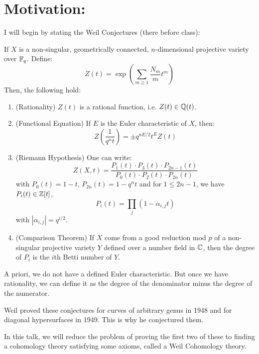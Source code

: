 \documentclass[12pt]{amsart}
\begin{document}


\section{Motivation:}

I will begin by stating the Weil Conjectures (there before class):

\begin{theorem}
    If $X$ is a non-singular, geometrically connected, $n$-dimensional projective variety over $\mathbb F_q$. Define:
    \[ Z(t) = \exp\left(\sum_{m\geq 1} \frac{N_m}{m}t^m\right)\]
    Then, the following hold: 
    \begin{enumerate}
        \item (Rationality) $Z(t)$ is a rational function, i.e. $Z(t) \in \mathbb Q(t)$.
        \item (Functional Equation) If $E$ is the Euler characteristic of $X$, then:
        \[ Z(\frac{1}{q^nt}) = \pm q^{nE/2}t^E Z(t) \]
        \item (Riemann Hypothesis) One can write:
        \[ Z(X,t) = \frac{P_1(t)\cdot P_3(t) \cdot P_{2n-1}(t)}{P_0(t)\cdot P_2(t) \cdot P_{2n}(t)} \]
        with $P_0(t) = 1-t$, $P_{2n}(t) = 1-q^nt$ and for $1 \leq 2n-1$, we have $P_i(t) \in \mathbb Z[t]$, 
        \[ P_i(t) = \prod_j (1-\alpha_{i,j}t) \] 
        with $|\alpha_{i,j}| = q^{i/2}$.
        \item (Comparison Theorem) If $X$ come from a good reduction mod $p$ of a non-singular projective variety $Y$ defined over a number field in $\mathbb C$, then the degree of $P_i$ is the $i$th Betti number of $Y$.
    \end{enumerate}
\end{theorem}
\begin{remark}
    A priori, we do not have a defined Euler characteristic. But once we have rationality, we can define it as the degree of the denominator minus the degree of the numerator. 
\end{remark}

\begin{remark}
    Weil proved these conjectures for curves of arbitrary genus in 1948 and for diagonal hypersurfaces in 1949. This is why he conjectured them.
\end{remark}

In this talk, we will reduce the problem of proving the first two of these to finding a cohomology theory satisfying some axioms, called a Weil Cohomology theory.
\end{document}
